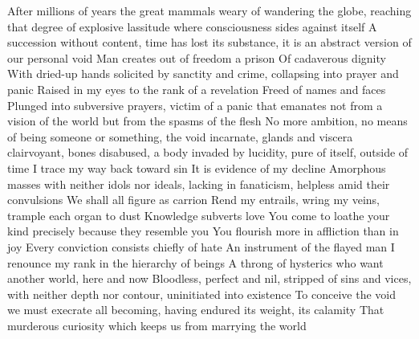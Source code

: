 \documentclass{article}
\begin{document}
After millions of years the great mammals weary of wandering the globe, reaching that degree of explosive lassitude where consciousness sides against itself
A succession without content, time has lost its substance, it is an abstract version of our personal void
Man creates out of freedom a prison
Of cadaverous dignity
With dried-up hands solicited by sanctity and crime, collapsing into prayer and panic
Raised in my eyes to the rank of a revelation
Freed of names and faces
Plunged into subversive prayers, victim of a panic that emanates not from a vision of the world but from the spasms of the flesh
No more ambition, no means of being someone or something, the void incarnate, glands and viscera clairvoyant, bones disabused, a body invaded by lucidity, pure of itself, outside of time
I trace my way back toward sin
It is evidence of my decline
Amorphous masses with neither idols nor ideals, lacking in fanaticism, helpless amid their convulsions
We shall all figure as carrion
Rend my entrails, wring my veins, trample each organ to dust
Knowledge subverts love
You come to loathe your kind precisely because they resemble you
You flourish more in affliction than in joy
Every conviction consists chiefly of hate
An instrument of the flayed man
I renounce my rank in the hierarchy of beings
A throng of hysterics who want another world, here and now
Bloodless, perfect and nil, stripped of sins and vices, with neither depth nor contour, uninitiated into existence
To conceive the void we must execrate all becoming, having endured its weight, its calamity
That murderous curiosity which keeps us from marrying the world
\fi
\end{document}
